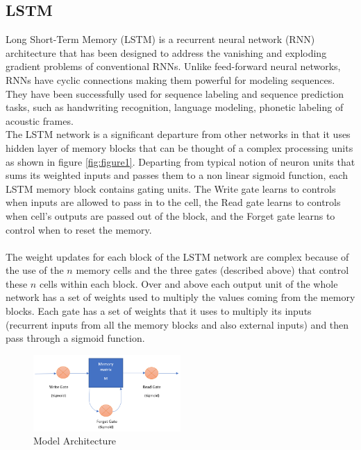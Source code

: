 \documentclass[conference]{IEEEtran}
\begin{document}
\subsection{LSTM}
Long Short-Term Memory (LSTM) is a recurrent neural network (RNN) architecture that has been designed to address the vanishing and exploding gradient problems of conventional RNNs. Unlike feed-forward neural networks, RNNs have cyclic connections making them powerful for modeling sequences. They have been successfully used for sequence labeling and sequence prediction tasks, such as handwriting recognition, language modeling, phonetic labeling of acoustic frames. \cite{lstm}\\
The LSTM network is a significant departure from other networks in that it uses hidden layer of memory blocks that can be thought of a complex processing units as shown in figure \ref{fig:figure1}. Departing from typical notion of neuron units that sums its weighted inputs and passes them to a non linear sigmoid function, each LSTM memory block contains gating units. The Write gate learns to controls when inputs are allowed to pass in to the cell, the Read gate learns to controls when cell's outputs are passed out of the block, and the Forget gate learns to control when to reset the memory.\\
\\The weight updates for each block of the LSTM network are complex because of the use of the $n$ memory cells and the three gates (described above) that control these $n$ cells within each block. Over and above each output unit of the whole network has a set of weights used to multiply the values coming from the memory blocks. Each gate has a set of weights that it uses to multiply its inputs (recurrent inputs from all the memory blocks and also external inputs) and then pass through a sigmoid function. \cite{judy}

\begin{figure}[h]
\includegraphics[width=0.5\textwidth]{3.PNG}
\caption{Model Architecture}
\label{fig:figure8}
\end{figure}
\end{document}

